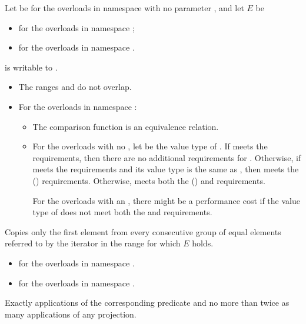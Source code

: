 \begin{itemdescr}
\pnum
Let  be  for the overloads
in namespace  with no parameter , and
let $E$ be
\begin{itemize}
\setlength{\emergencystretch}{1em}
\item
  for the overloads in namespace ;
\item
  for the overloads in namespace .
\end{itemize}

\pnum
\mandates
{} is writable to .

\pnum
\expects
\begin{itemize}
\item
  The ranges  and 
  do not overlap.
\item
  For the overloads in namespace :
  \begin{itemize}
  \item
    The comparison function is an equivalence relation.
  \item
    For the overloads with no ,
    let  be the value type of .
    If  meets
    the  requirements,
    then there are no additional requirements for .
    Otherwise, if  meets
    the  requirements and
    its value type is the same as ,
    then  meets
    the  () requirements.
    Otherwise,  meets both
    the  () and
     requirements.
    \begin{note}
    For the overloads with an ,
    there might be a performance cost
    if the value type of  does not meet both the
     and  requirements.
    \end{note}
  \end{itemize}
\end{itemize}

\pnum
\effects
Copies only the first element from every consecutive group of equal elements
referred to by the iterator  in the range 
for which $E$ holds.

\pnum
\returns
\begin{itemize}
\item {} for the overloads in namespace .
\item {} for the overloads in namespace .
\end{itemize}

\pnum
\complexity
Exactly  applications
of the corresponding predicate
and no more than twice as many applications of any projection.
\end{itemdescr}

